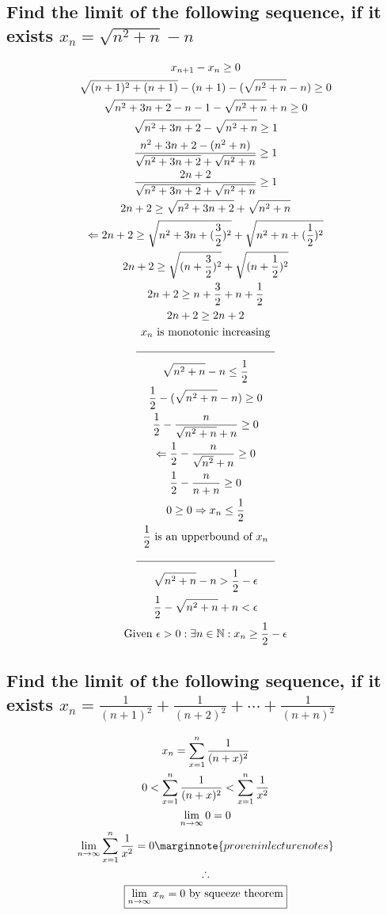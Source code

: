 \documentclass[letterpaper]{article}
\begin{document}
\subsection{Find the limit of the following sequence, if it exists $x_n=\sqrt{n^2+n}-n$}
\begin{gather*}
x_{n+1}-x_n\geq0 \\
\sqrt{(n+1)^2+(n+1)}-(n+1)-(\sqrt{n^2+n}-n)\geq0 \\
\sqrt{n^2+3n+2}-n-1-\sqrt{n^2+n}+n\geq0 \\
\sqrt{n^2+3n+2}-\sqrt{n^2+n}\geq1 \\
\frac{n^2+3n+2-(n^2+n)}{\sqrt{n^2+3n+2}+\sqrt{n^2+n}}\geq1 \\
\frac{2n+2}{\sqrt{n^2+3n+2}+\sqrt{n^2+n}}\geq1 \\
2n+2\geq\sqrt{n^2+3n+2}+\sqrt{n^2+n} \\
\Leftarrow 2n+2\geq\sqrt{n^2+3n+(\frac{3}{2})^2}+\sqrt{n^2+n+(\frac{1}{2})^2} \\
2n+2\geq\sqrt{(n+\frac{3}{2})^2}+\sqrt{(n+\frac{1}{2})^2} \\
2n+2\geq n+\frac{3}{2}+n+\frac{1}{2} \\
2n+2\geq2n+2 \\
\text{$x_n$ is monotonic increasing} \\
\line(1, 0){125} \\
\sqrt{n^2+n}-n\leq\frac{1}{2} \\
\frac{1}{2}-(\sqrt{n^2+n}-n)\geq0 \\
\frac{1}{2}-\frac{n}{\sqrt{n^2+n}+n}\geq0 \\
\Leftarrow \frac{1}{2}-\frac{n}{\sqrt{n^2}+n}\geq0 \\
\frac{1}{2}-\frac{n}{n+n}\geq0 \\
0\geq0 \Rightarrow x_n\leq\frac{1}{2} \\
\frac{1}{2}\text{ is an upperbound of }x_n \\
\line(1, 0){125} \\
\sqrt{n^2+n}-n>\frac{1}{2}-\epsilon \\
\frac{1}{2}-\sqrt{n^2+n}+n<\epsilon \\
\text{Given }\epsilon>0:\exists n\in\mathbb{N}:x_n\geq\frac{1}{2}-\epsilon
\end{gather*}
\subsection{Find the limit of the following sequence, if it exists $x_n=\frac{1}{(n+1)^2}+\frac{1}{(n+2)^2}+\dotsb+\frac{1}{(n+n)^2}$}
\begin{gather*}
x_n=\sum_{x=1}^{n}\frac{1}{(n+x)^2} \\
0<\sum_{x=1}^{n}\frac{1}{(n+x)^2}<\sum_{x=1}^{n}\frac{1}{x^2}\\
\lim_{n\rightarrow\infty}0=0 \\
\lim_{n\rightarrow\infty}\sum_{x=1}^{n}\frac{1}{x^2}=0 \marginnote{proven in lecture notes} \\
\therefore \\
\boxed{\lim_{n\rightarrow\infty}x_n=0\text{ by squeeze theorem}}
\end{gather*}
\end{document}
